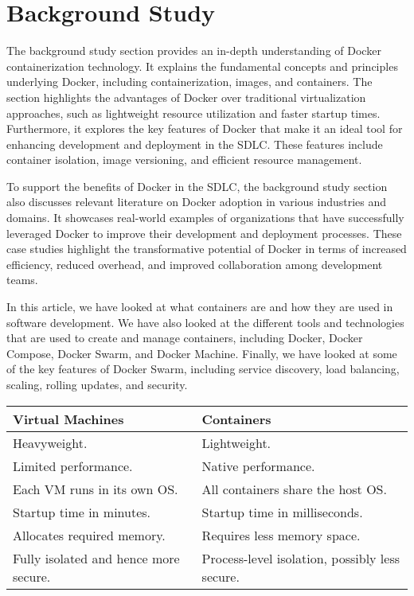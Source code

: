 \section{Background Study}

The background study section provides an in-depth understanding of Docker containerization technology. It explains the fundamental concepts and principles underlying Docker, including containerization, images, and containers. The section highlights the advantages of Docker over traditional virtualization approaches, such as lightweight resource utilization and faster startup times. Furthermore, it explores the key features of Docker that make it an ideal tool for enhancing development and deployment in the SDLC. These features include container isolation, image versioning, and efficient resource management.

To support the benefits of Docker in the SDLC, the background study section also discusses relevant literature on Docker adoption in various industries and domains. It showcases real-world examples of organizations that have successfully leveraged Docker to improve their development and deployment processes. These case studies highlight the transformative potential of Docker in terms of increased efficiency, reduced overhead, and improved collaboration among development teams.


In this article, we have looked at what containers are and how they are used in software development. We have also looked at the different tools and technologies that are used to create and manage containers, including Docker, Docker Compose, Docker Swarm, and Docker Machine. Finally, we have looked at some of the key features of Docker Swarm, including service discovery, load balancing, scaling, rolling updates, and security.

\begin{table}[h]
    \begin{tabular}{|l|l|}
    \hline
    \textbf{Virtual Machines}             & \textbf{Containers}                            \\ \hline
    Heavyweight.                          & Lightweight.                                   \\
    Limited performance.                  & Native performance.                            \\
    Each VM runs in its own OS.           & All containers share the host OS.              \\
    Startup time in minutes.              & Startup time in milliseconds.                  \\
    Allocates required memory.            & Requires less memory space.                    \\
    Fully isolated and hence more secure. & Process-level isolation, possibly less secure. \\ \hline
    \end{tabular}
\end{table}

